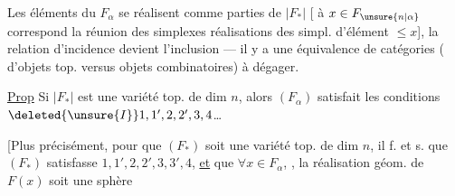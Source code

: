 



Les éléments du $F_\alpha$ se réalisent comme parties  de $|F_*|$ [ à $x\in F_{\unsure{n|\alpha}}$ correspond la réunion des simplexes réalisations des simpl.   d'élément $\leq x$], la relation d'incidence devient l'inclusion --- il y a une équivalence de catégories ( d'objets top. versus objets combinatoires) à dégager.

\uline{Prop} Si $|F_*|$ est une variété top.  de dim $n$, alors $(F_\alpha)$ satisfait les conditions $\deleted{\unsure{I}}1,1',2,2',3,4$\ldots

[Plus précisément, pour que $(F_*)$ soit une variété top. de dim $n$, il f. et s. que $(F_*)$ satisfasse $1,1',2,2',3,3',4$, \uline{et} que $\forall x\in F_\alpha$, , la réalisation géom. de $F(x)$ soit une sphère

